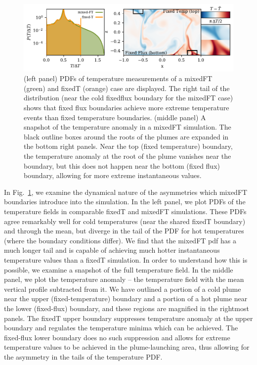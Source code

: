 \documentclass[aps, pre, onecolumn, nofootinbib, notitlepage, groupedaddress, amsfonts, amssymb, amsmath, longbibliography]{revtex4-1}
\begin{document}
\begin{figure}
\includegraphics[width=\textwidth]{./figs/rbc_dynamics_asymmetries.pdf}
\caption{ 
	(left panel) PDFs of temperature measurements of a mixedFT (green) and fixedT (orange) case are displayed.
	The right tail of the distribution (near the cold fixedflux boundary for the mixedFT case) shows that fixed flux boundaries achieve more extreme temperature events than fixed temperature boundaries.
	(middle panel) A snapshot of the temperature anomaly in a mixedFT simulation.
	The black outline boxes around the roots of the plumes are expanded in the bottom right panels.
	Near the top (fixed temperature) boundary, the temperature anomaly at the root of the plume vanishes near the boundary, but this does not happen near the bottom (fixed flux) boundary, allowing for more extreme instantaneous values.
\label{fig:rbc_dynamics_asymmetries} }
\end{figure}

In Fig.~\ref{fig:rbc_dynamics_asymmetries}, we examine the dynamical nature of the asymmetries which mixedFT boundaries introduce into the simulation.
In the left panel, we plot PDFs of the temperature fields in comparable fixedT and mixedFT simulations.
These PDFs agree remarkably well for cold temperatures (near the shared fixedT boundary) and through the mean, but diverge in the tail of the PDF for hot temperatures (where the boundary conditions differ).
We find that the mixedFT pdf has a much longer tail and is capable of achieving much hotter instantaneous temperature values than a fixedT simulation.
In order to understand how this is possible, we examine a snapshot of the full temperature field.
In the middle panel, we plot the temperature anomaly -- the temperature field with the mean vertical profile subtracted from it.
We have outlined a portion of a cold plume near the upper (fixed-temperature) boundary and a portion of a hot plume near the lower (fixed-flux) boundary, and these regions are magnified in the rightmost panels.
The fixedT upper boundary suppresses temperature anomaly at the upper boundary and regulates the temperature minima which can be achieved.
The fixed-flux lower boundary does no such suppression and allows for extreme temperature values to be achieved in the plume-launching area, thus allowing for the asymmetry in the tails of the temperature PDF.
\end{document}
